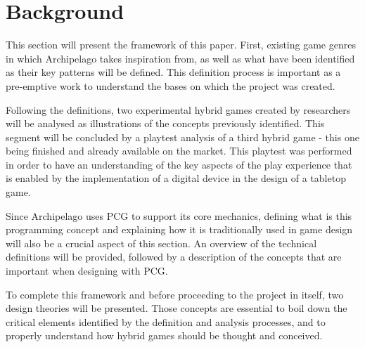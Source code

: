 \section{Background}
This section will present the framework of this paper. First, existing game genres in which Archipelago takes inspiration from, as well as what have been identified as their key patterns will be defined. This definition process is important as a pre-emptive work to understand the bases on which the project was created. 

Following the definitions, two experimental hybrid games created by researchers will be analysed as illustrations of the concepts previously identified. This segment will be concluded by a playtest analysis of a third hybrid game - this one being finished and already available on the market. This playtest was performed in order to have an understanding of the key aspects of the play experience that is enabled by the implementation of a digital device in the design of a tabletop game.

Since Archipelago uses PCG to support its core mechanics, defining what is this programming concept and explaining how it is traditionally used in game design will also be a crucial aspect of this section. An overview of the technical definitions will be provided, followed by a description of the concepts that are important when designing with PCG. 

To complete this framework and before proceeding to the project in itself, two design theories will be presented. Those concepts are essential to boil down the critical elements identified by the definition and analysis processes, and to properly understand how hybrid games should be thought and conceived.


